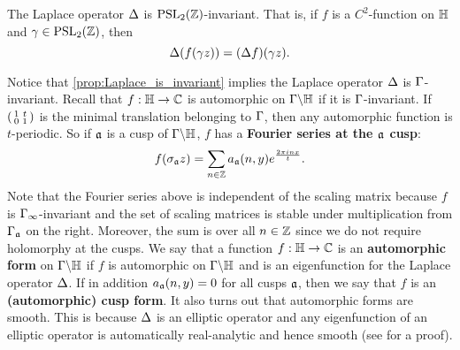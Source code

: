       \begin{proposition}\label{prop:Laplace_is_invariant}
        The Laplace operator $\Delta$ is $\mathrm{PSL}_{2}(\mathbb{Z})$-invariant. That is, if $f$ is a $C^{2}$-function on $\mathbb{H}$ and $\gamma \in \mathrm{PSL}_{2}(\mathbb{Z})$, then
        \[
          \Delta(f(\gamma z)) = (\Delta f)(\gamma z).
        \]
      \end{proposition}

      Notice that \cref{prop:Laplace_is_invariant} implies the Laplace operator $\Delta$ is $\Gamma$-invariant. Recall that $f:\mathbb{H} \to \mathbb{C}$ is automorphic on $\Gamma\backslash\mathbb{H}$ if it is $\Gamma$-invariant. If $\begin{psmallmatrix} 1 & t \\ 0 & 1 \end{psmallmatrix}$ is the minimal translation belonging to $\Gamma$, then any automorphic function is $t$-periodic. So if $\mathfrak{a}$ is a cusp of $\Gamma\backslash\mathbb{H}$, $f$ has a \textbf{Fourier series at the $\mathfrak{a}$ cusp}:
      \[
        f(\sigma_{\mathfrak{a}}z) = \sum_{n \in \mathbb{Z}}a_{\mathfrak{a}}(n,y)e^{\frac{2\pi inx}{t}}.
      \]
      Note that the Fourier series above is independent of the scaling matrix because $f$ is $\Gamma_{\infty}$-invariant and the set of scaling matrices is stable under multiplication from $\Gamma_{\mathfrak{a}}$ on the right. Moreover, the sum is over all $n \in \mathbb{Z}$ since we do not require holomorphy at the cusps. We say that a function $f:\mathbb{H} \to \mathbb{C}$ is an \textbf{automorphic form} on $\Gamma\backslash\mathbb{H}$ if $f$ is automorphic on $\Gamma\backslash\mathbb{H}$ and is an eigenfunction for the Laplace operator $\Delta$. If in addition $a_{\mathfrak{a}}(n,y) = 0$ for all cusps $\mathfrak{a}$, then we say that $f$ is an \textbf{(automorphic) cusp form}. It also turns out that automorphic forms are smooth. This is because $\Delta$ is an elliptic operator and any eigenfunction of an elliptic operator is automatically real-analytic and hence smooth (see \cite{evans2022partial} for a proof).

